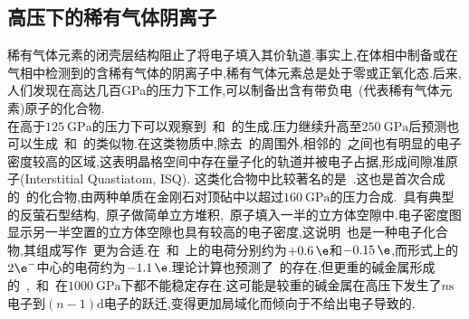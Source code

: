 \documentclass{ctexbook}
\begin{document}
\subsection{高压下的稀有气体阴离子}
稀有气体元素的闭壳层结构阻止了将电子填入其价轨道.事实上,在体相中制备或在气相中检测到的含稀有气体的阴离子中,稀有气体元素总是处于零或正氧化态.后来,人们发现在高达几百GPa的压力下工作,可以制备出含有带负电~(代表稀有气体元素)原子的化合物.\\
\indent 在高于$\SI{125}{\giga\pascal}$的压力下可以观察到~和~的生成.压力继续升高至$\SI{250}{\giga\pascal}$后预测也可以生成~和~的类似物.在这类物质中,除去~的周围外,相邻的~之间也有明显的电子密度较高的区域\cite{Miao2015},这表明晶格空间中存在量子化的轨道并被电子占据,形成间隙准原子(Interstitial Quastiatom, ISQ).
\indent 这类化合物中比较著名的是~.这也是首次合成的~的化合物,由两种单质在金刚石对顶砧中以超过$\SI{160}{\giga\pascal}$的压力合成.~具有典型的反萤石型结构,~原子做简单立方堆积,~原子填入一半的立方体空隙中.电子密度图显示另一半空置的立方体空隙也具有较高的电子密度,这说明~也是一种电子化合物,其组成写作~更为合适.在~和~上的电荷分别约为$+0.6\,\e$和$-0.15\,\e$,而形式上的$2\e^-$中心的电荷约为$-1.1\,\e$.理论计算也预测了~的存在,但更重的碱金属形成的~,~和~在$\SI{1000}{\giga\pascal}$下都不能稳定存在.这可能是较重的碱金属在高压下发生了$n\text{s}$电子到$(n-1)\text{d}$电子的跃迁,变得更加局域化而倾向于不给出电子导致的.
\end{document}
